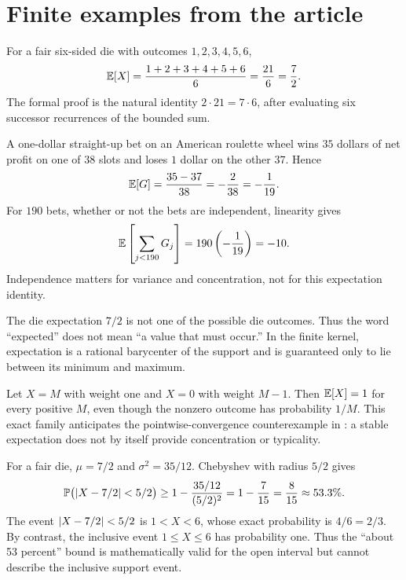 \section{Finite examples from the article}\label{sec:examples}

\begin{example}\label{ex:die}
For a fair six-sided die with outcomes \(1,2,3,4,5,6\),
\[
 \mathbb E[X]=\frac{1+2+3+4+5+6}{6}=\frac{21}{6}=\frac72.
\]
The formal proof is the natural identity \(2\cdot21=7\cdot6\), after evaluating
six successor recurrences of the bounded sum.
\end{example}

\begin{example}\label{ex:roulette}
A one-dollar straight-up bet on an American roulette wheel wins \(35\) dollars
of net profit on one of \(38\) slots and loses \(1\) dollar on the other
\(37\).  Hence
\[
 \mathbb E[G]=\frac{35-37}{38}=-\frac{2}{38}=-\frac1{19}.
\]
For \(190\) bets, whether or not the bets are independent, linearity gives
\[
 \mathbb E\left[\sum_{j<190}G_j\right]
 =190\left(-\frac1{19}\right)=-10.
\]
Independence matters for variance and concentration, not for this expectation
identity.
\end{example}

\begin{example}\label{ex:not-attained}
The die expectation \(7/2\) is not one of the possible die outcomes.  Thus the
word ``expected'' does not mean ``a value that must occur.''  In the finite
kernel, expectation is a rational barycenter of the support and is guaranteed
only to lie between its minimum and maximum.
\end{example}

\begin{example}\label{ex:rare-payoff}
Let \(X=M\) with weight one and \(X=0\) with weight \(M-1\).  Then
\(\mathbb E[X]=1\) for every positive \(M\), even though the nonzero outcome has
probability \(1/M\).  This exact family anticipates the pointwise-convergence
counterexample in : a stable expectation does not by
itself provide concentration or typicality.
\end{example}

\begin{audit}\label{audit:die-cheb}
For a fair die, \(\mu=7/2\) and \(\sigma^2=35/12\).  Chebyshev with radius
\(5/2\) gives
\[
 \mathbb P\bigl(\lvert X-7/2\rvert<5/2\bigr)
 \ge 1-\frac{35/12}{(5/2)^2}
 =1-\frac7{15}=\frac8{15}\approx53.3\%.
\]
The event \(\lvert X-7/2\rvert<5/2\) is \(1<X<6\), whose exact probability is
\(4/6=2/3\).  By contrast, the inclusive event \(1\le X\le6\) has probability
one.  Thus the ``about 53 percent'' bound is mathematically valid for the open
interval but cannot describe the inclusive support event.
\end{audit}
